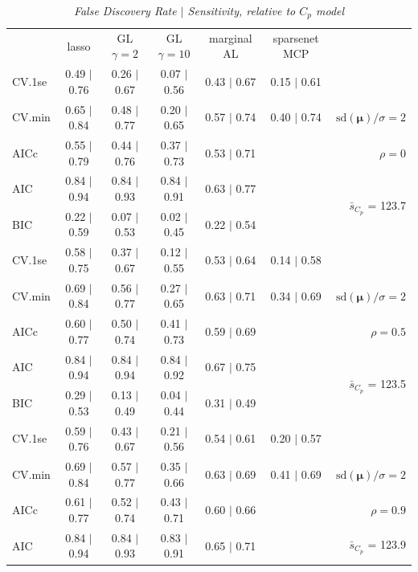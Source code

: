 \documentclass[12pt]{article}
\newcommand{\mr}[1]{\mathrm{#1}}
\newcommand{\bm}[1]{\mathbf{#1}}
\begin{document}
\begin{table}[p]\vspace{-.5cm}
\caption[l]{\label{sens}\it False Discovery Rate $\mid$ Sensitivity, relative to $C_p$ model\hfill}
\vspace{-.5cm}
\small{}
\begin{center}
\begin{tabular}{l*{5}{c}|r}
 & lasso & GL $\gamma=2$ & GL $\gamma=10$ & marginal AL & sparsenet MCP  & \\
 \cline{1-7}
CV.1se & 0.49 $\mid$ 0.76 & 0.26 $\mid$ 0.67 & 0.07 $\mid$ 0.56 & 0.43 $\mid$ 0.67 & 0.15 $\mid$ 0.61 &\\
CV.min & 0.65 $\mid$ 0.84 & 0.48 $\mid$ 0.77 & 0.20 $\mid$ 0.65 & 0.57 $\mid$ 0.74 & 0.40 $\mid$ 0.74 &  $\mr{sd}(\bm{\mu})/\sigma=2$ \\
AICc & 0.55 $\mid$ 0.79 & 0.44 $\mid$ 0.76 & 0.37 $\mid$ 0.73 & 0.53 $\mid$ 0.71 & & $\rho=0$ \\
AIC & 0.84 $\mid$ 0.94 & 0.84 $\mid$ 0.93 & 0.84 $\mid$ 0.91 & 0.63 $\mid$ 0.77 & & \multirow{2}{*}{$\bar{s}_{C_p}$ = 123.7} \\
BIC & 0.22 $\mid$ 0.59 & 0.07 $\mid$ 0.53 & 0.02 $\mid$ 0.45 & 0.22 $\mid$ 0.54 & & \\
 \hline 
CV.1se & 0.58 $\mid$ 0.75 & 0.37 $\mid$ 0.67 & 0.12 $\mid$ 0.55 & 0.53 $\mid$ 0.64 & 0.14 $\mid$ 0.58 &\\
CV.min & 0.69 $\mid$ 0.84 & 0.56 $\mid$ 0.77 & 0.27 $\mid$ 0.65 & 0.63 $\mid$ 0.71 & 0.34 $\mid$ 0.69 &  $\mr{sd}(\bm{\mu})/\sigma=2$ \\
AICc & 0.60 $\mid$ 0.77 & 0.50 $\mid$ 0.74 & 0.41 $\mid$ 0.73 & 0.59 $\mid$ 0.69 & & $\rho=0.5$ \\
AIC & 0.84 $\mid$ 0.94 & 0.84 $\mid$ 0.94 & 0.84 $\mid$ 0.92 & 0.67 $\mid$ 0.75 & & \multirow{2}{*}{$\bar{s}_{C_p}$ = 123.5} \\
BIC & 0.29 $\mid$ 0.53 & 0.13 $\mid$ 0.49 & 0.04 $\mid$ 0.44 & 0.31 $\mid$ 0.49 & & \\
 \hline 
CV.1se & 0.59 $\mid$ 0.76 & 0.43 $\mid$ 0.67 & 0.21 $\mid$ 0.56 & 0.54 $\mid$ 0.61 & 0.20 $\mid$ 0.57 &\\
CV.min & 0.69 $\mid$ 0.84 & 0.57 $\mid$ 0.77 & 0.35 $\mid$ 0.66 & 0.63 $\mid$ 0.69 & 0.41 $\mid$ 0.69 &  $\mr{sd}(\bm{\mu})/\sigma=2$ \\
AICc & 0.61 $\mid$ 0.77 & 0.52 $\mid$ 0.74 & 0.43 $\mid$ 0.71 & 0.60 $\mid$ 0.66 & & $\rho=0.9$ \\
AIC & 0.84 $\mid$ 0.94 & 0.84 $\mid$ 0.93 & 0.83 $\mid$ 0.91 & 0.65 $\mid$ 0.71 & & \multirow{2}{*}{$\bar{s}_{C_p}$ = 123.9} \\

\end{tabular}
\end{center}
\end{table}
\end{document}
